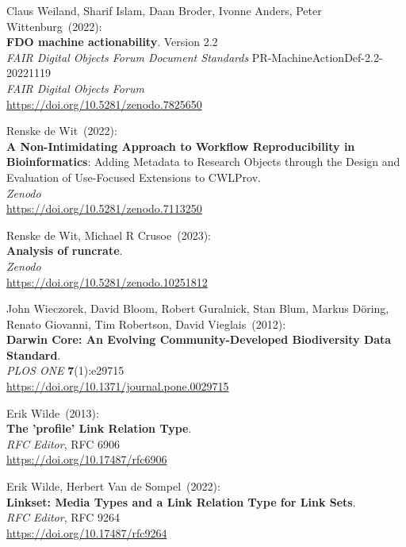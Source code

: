 \begin{thebibliography}{9}
Claus Weiland, Sharif Islam, Daan Broder, Ivonne Anders, Peter Wittenburg~(2022): \\
\textbf{{FDO} machine actionability}. Version 2.2 \\
\emph{{FAIR Digital Objects Forum Document Standards}} PR-MachineActionDef-2.2-20221119 \\
\emph{FAIR Digital Objects Forum} \\
\url{https://doi.org/10.5281/zenodo.7825650}

Renske de Wit~(2022): \\
\textbf{A Non-Intimidating Approach to Workflow Reproducibility in Bioinformatics}: Adding Metadata to Research Objects through the Design and Evaluation of Use-Focused Extensions to CWLProv.\\
\emph{Zenodo}\\
\url{https://doi.org/10.5281/zenodo.7113250}

Renske de Wit, Michael R Crusoe~(2023): \\
\textbf{Analysis of runcrate}.\\
\emph{Zenodo}\\
\url{https://doi.org/10.5281/zenodo.10251812}

John Wieczorek, David Bloom, Robert Guralnick, Stan Blum, Markus Döring, Renato Giovanni, Tim Robertson, David Vieglais~(2012): \\
\textbf{Darwin {Core}: {An Evolving Community-Developed Biodiversity Data Standard}}.\\
\emph{PLOS ONE} \textbf{7}(1):e29715 \\
\url{https://doi.org/10.1371/journal.pone.0029715}

Erik Wilde~(2013): \\
\textbf{The 'profile' Link Relation Type}.\\
\emph{RFC Editor}, RFC 6906\\
\url{https://doi.org/10.17487/rfc6906}

Erik Wilde, Herbert Van de Sompel~(2022): \\
\textbf{Linkset: Media Types and a Link Relation Type for Link Sets}.\\
\emph{RFC Editor}, RFC 9264\\
\url{https://doi.org/10.17487/rfc9264}


\end{thebibliography}
